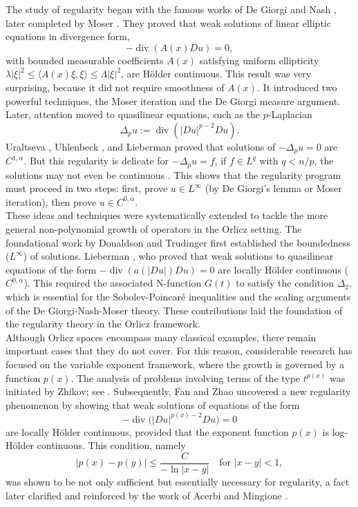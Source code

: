 \documentclass[10pt,reqno]{amsart}
\newcommand *\w{^\wedge}
\theoremstyle{definition}
\numberwithin{equation}{section}
\begin{document}
The study of regularity began with the famous works of De Giorgi \cite{deGiorgi1957} and Nash \cite{Nash1958}, later completed by Moser \cite{Moser1960,Moser1961}. 
They proved that weak solutions of linear elliptic equations in divergence form,
\[
-\operatorname{div}(A(x)D u)=0,
\]
with bounded measurable coefficients $A(x)$ satisfying uniform ellipticity
$\lambda |\xi|^2 \le \langle A(x)\xi,\xi\rangle \le \Lambda |\xi|^2$,
are H\"older continuous. 
This result was very surprising, because it did not require smoothness of $A(x)$. 
It introduced two powerful techniques, the Moser iteration and the De Giorgi measure argument.
Later, attention moved to quasilinear equations, such as the $p$-Laplacian
\[
\Delta_p u := \operatorname{div}(|D u|^{p-2}D u).
\]
Uraltseva \cite{Uraltseva1968}, Uhlenbeck \cite{Uhlenbeck1977}, and Lieberman \cite{Li1988} proved that solutions of $-\Delta_p u=0$ are $C^{1,\alpha}$. 
But this regularity is delicate for $-\Delta_p u=f$, if $f \in L^q$ with $q<n/p$, the solutions may not even be continuous \cite{MG2,marc1,Mar1}. 
This shows that the regularity program must proceed in two steps: first, prove $u\in L^\infty$ (by De Giorgi’s lemma or Moser iteration), then prove $u\in C^{0,\alpha}$.\\

These ideas and techniques were systematically extended to tackle the more general non-polynomial growth of operators in the Orlicz setting. The foundational work by Donaldson and Trudinger \cite{DonaldsonTrudinger1971} first established the boundedness ($L^\infty$) of solutions.  Lieberman \cite{Li1991}, who proved that weak solutions to quasilinear equations of the form $-\operatorname{div}(a(|D u|)D u) = 0$ are locally H\"older continuous ($C^{0,\alpha}$). This required the associated \textnormal{N}-function $G(t)$ to satisfy the condition $\Delta_2$, which is essential for the Sobolev-Poincar\'e inequalities and the scaling arguments of the De Giorgi-Nash-Moser theory. These contributions laid the foundation of the regularity theory in the Orlicz framework.\\

Although Orlicz spaces encompass many classical examples, there remain important cases that they do not cover. For this reason, considerable research has focused on the variable exponent framework, where the growth is governed by a function $p(x)$. The analysis of problems involving terms of the type $t^{p(x)}$ was initiated by Zhikov; see \cite{Zhikov1987,Zhikov1995}. Subsequently, Fan and Zhao \cite{Fan1999} uncovered a new regularity phenomenon by showing that weak solutions of equations of the form
\[
-\operatorname{div}\big(|Du|^{p(x)-2}Du\big)=0
\]
are locally H\"older continuous, provided that the exponent function $p(x)$ is log-H\"older continuous. This condition, namely
\[
|p(x)-p(y)| \le \frac{C}{-\ln |x-y|} \quad \text{for } |x-y|<1,
\]
was shown to be not only sufficient but essentially necessary for regularity, a fact later clarified and reinforced by the work of Acerbi and Mingione \cite{Acerbi2007}.\\
\end{document}
